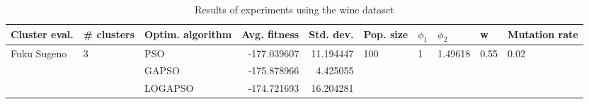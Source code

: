 \begin{table}
\centering
\caption{Results of experiments using the wine dataset}
\begin{tabular}{lllrrlllll}
\toprule
               Cluster eval. &        \# clusters & Optim. algorithm &  Avg. fitness &  Std. dev. &            Pop. size &         $\phi_{1}$ &               $\phi_{2}$ &                     w &         Mutation rate \\
\midrule
\multirow{3}{*}{Fuku Sugeno} & \multirow{3}{*}{3} &              PSO &   -177.039607 &  11.194447 & \multirow{3}{*}{100} & \multirow{3}{*}{1} & \multirow{3}{*}{1.49618} & \multirow{3}{*}{0.55} & \multirow{3}{*}{0.02} \\
                             &                    &            GAPSO &   -175.878966 &   4.425055 &                      &                    &                          &                       &                       \\
                             &                    &          LOGAPSO &   -174.721693 &  16.204281 &                      &                    &                          &                       &                       \\
\bottomrule
\end{tabular}
\end{table}
